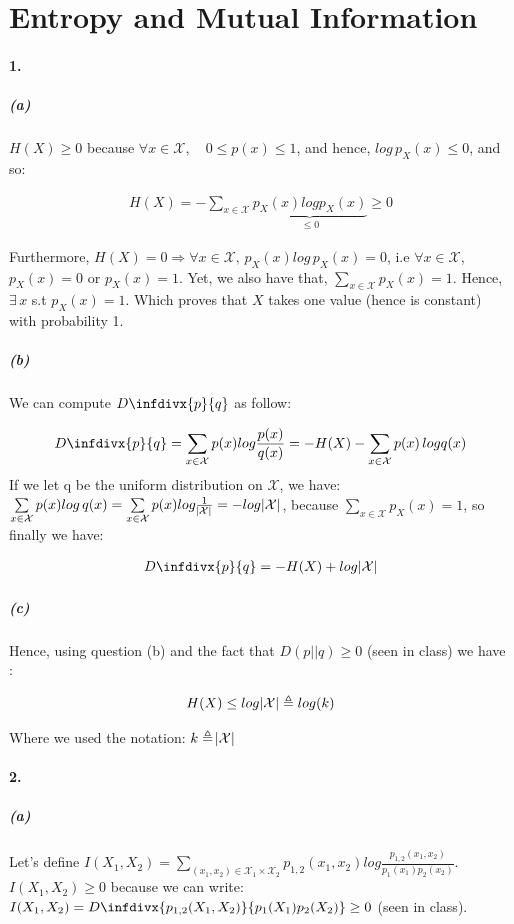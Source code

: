\documentclass[11pt]{article}
\newcommand{\infdiv}{D\infdivx}
\numberwithin{figure}{section} %
\begin{document}
\section{Entropy and Mutual Information}
\paragraph{1.} \subparagraph{(a)} $H(X) \geq 0$ because $\forall x \in \mathcal{X}, \quad 0 \leq p(x) \leq 1$, and hence, $log\, p_X(x) \leq 0$, and so:

\begin{align*}
H(X) = - \sum\limits_{x \in \mathcal{X}} \underbrace{p_X(x)log p_X(x)}_{\leq 0} \geq 0
\end{align*}

Furthermore, $H(X) = 0 \Rightarrow \forall x \in \mathcal{X}, \, p_X(x) log\, p_X(x) = 0$, i.e $\forall x \in \mathcal{X}$,
$p_X(x) = 0$ or $p_X(x) = 1$. Yet, we also have that, $\sum\limits_{x \in \mathcal{X}} p_X(x) = 1$. Hence, $\exists \,x$ s.t $p_X(x) = 1$.
Which proves that $X$ takes one value (hence is constant) with probability 1.

\subparagraph{(b)}
We can compute $\infdiv{p}{q}$ as follow:

\begin{align*}
\infdiv{p}{q} = \sum\limits_{x \in \mathcal{X}} p(x)log\frac{p(x)}{q(x)} = -H(X) - \sum\limits_{x \in \mathcal{X}} p(x) \,log q(x)
\end{align*}
If we let q be the uniform distribution on $\mathcal{X}$, we have: $\sum\limits_{x \in \mathcal{X}} p(x)log \,q(x) = \sum\limits_{x \in \mathcal{X}} p(x)log \frac{1}{\abs{\mathcal{X}}}
= -log \abs{\mathcal{X}}$, because $\sum\limits_{x \in \mathcal{X}} p_X(x) = 1$, so finally we have:

\begin{align*}
\infdiv{p}{q} = -H(X) + log \abs{\mathcal{X}}
\end{align*}

\subparagraph{(c)}
Hence, using question (b) and the fact that $D(p || q) \geq 0$ (seen in class) we have :

\begin{align*}
H(X) \leq log \abs{\mathcal{X}} \triangleq log(k)
\end{align*}

Where we used the notation: $k \triangleq \abs{\mathcal{X}}$

\paragraph{2.}
\subparagraph{(a)}
Let's define $I(X_1, X_2) = \sum\limits_{(x_1,x_2) \in \mathcal{X}_1 \times \mathcal{X}_2} p_{1,2}(x_1,x_2) log \frac{p_{1,2}(x_1,x_2)}{p_1(x_1)p_2(x_2)}$. $I(X_1, X_2) \geq 0$
because we can write: $I(X_1, X_2) = \infdiv{p_{1,2}(X_1, X_2)}{p_1(X_1)p_2(X_2)} \geq 0$ (seen in class).
\end{document}
